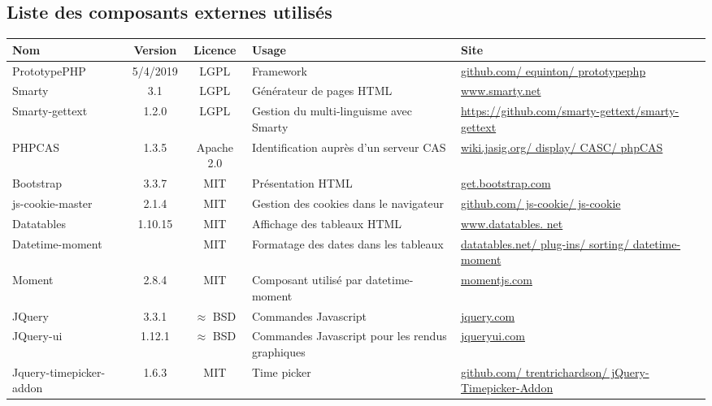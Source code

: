 \subsection{Liste des composants externes utilisés}
\begin{longtable}{|>{\raggedright\arraybackslash}p{3cm}|c|c|>{\raggedright\arraybackslash}p{3cm}|>{\raggedright\arraybackslash}p{3cm}|}
\hline 
\textbf{Nom} & \textbf{Version} & \textbf{Licence} & \textbf{Usage} & \textbf{Site} \\ 
\hline 
\endhead
PrototypePHP & 5/4/2019 & LGPL & Framework & \href{https://github.com/equinton/prototypephp}{github.com/ equinton/ prototypephp} \\ 
\hline 
Smarty & 3.1 & LGPL & Générateur de pages HTML & \href{http://www.smarty.net}{www.smarty.net} \\ 
\hline 
Smarty-gettext & 1.2.0 & LGPL & Gestion du multi-linguisme avec Smarty & \href{https://github.com/smarty-gettext/smarty-gettext}{https://github.com/smarty-gettext/smarty-gettext} \\
\hline
PHPCAS & 1.3.5 & Apache 2.0 & Identification auprès d'un serveur CAS & \href{https://wiki.jasig.org/display/CASC/phpCAS}{wiki.jasig.org/ display/ CASC/ phpCAS} \\ 
\hline 
Bootstrap & 3.3.7 & MIT & Présentation HTML & \href{http://getbootstrap.com}{get.bootstrap.com} \\ 
\hline 
js-cookie-master & 2.1.4 & MIT & Gestion des cookies dans le navigateur & \href{https://github.com/js-cookie/js-cookie}{github.com/ js-cookie/ js-cookie} \\ 
\hline 
Datatables & 1.10.15 & MIT & Affichage des tableaux HTML & \href{http://www.datatables.net/}{www.datatables. net} \\ 
\hline 
Datetime-moment &  & MIT & Formatage des dates dans les tableaux & \href{https://datatables.net/plug-ins/sorting/datetime-moment}{datatables.net/ plug-ins/ sorting/ datetime-moment} \\ 
\hline 
Moment & 2.8.4 & MIT & Composant utilisé par datetime-moment & \href{http://momentjs.com} {momentjs.com}\\ 
\hline 
JQuery & 3.3.1 & $\approx$ BSD & Commandes Javascript & \href{http://jquery.com/}{jquery.com} \\ 
\hline 
JQuery-ui & 1.12.1 & $\approx$ BSD & Commandes Javascript pour les rendus graphiques & \href{http://jqueryui.com/}{jqueryui.com} \\ 
\hline 
Jquery-timepicker-addon & 1.6.3 & MIT & Time picker & \href{https://github.com/trentrichardson/jQuery-Timepicker-Addon}{github.com/ trentrichardson/ jQuery-Timepicker-Addon} \\ 

\end{longtable}
